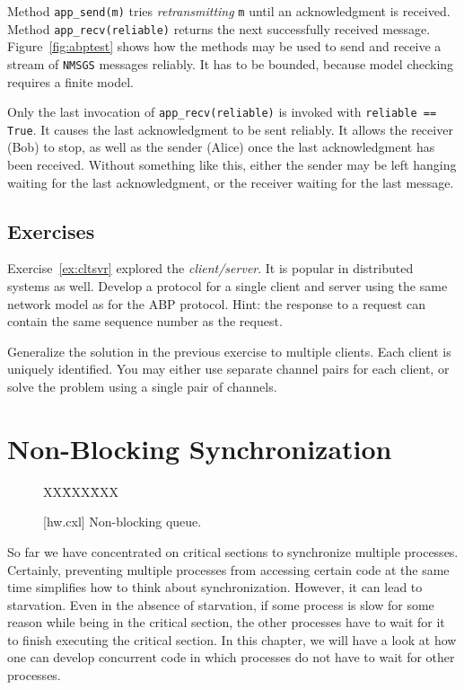 \documentclass{report}
\newcommand{\cxlsource}[1]{
\begin{tabbing}
XX\=XXX\=XXX\kill
    
\end{tabbing}
}
\newenvironment{code}{
\tcolorbox
}{
\endtcolorbox
}
\begin{document}
Method \texttt{app\_send(m)} tries \emph{retransmitting} \texttt{m} until
an acknowledgment is received.
Method \texttt{app\_recv(reliable)} returns the next successfully received
message.
Figure~\ref{fig:abptest} shows how the methods may be used to send and receive
a stream of \texttt{NMSGS} messages reliably.
It has to be bounded, because model checking requires a finite model.

Only the last invocation of \texttt{app\_recv(reliable)} is invoked with
\texttt{reliable == True}.  It causes the last acknowledgment to be sent
reliably.  It allows the receiver (Bob) to stop, as well as the sender (Alice)
once the last acknowledgment has been received.
Without something like this, either the sender may be left hanging waiting
for the last acknowledgment, or the receiver waiting for the last message.

\section*{Exercises}
\begin{problems}
\item Exercise~\ref{ex:cltsvr} explored the \emph{client/server}.  It is popular
in distributed systems as well.
Develop a protocol for a single client and server using the same network
model as for the ABP protocol.
Hint: the response to a request can contain the same sequence number as the
request.
\item Generalize the solution in the previous exercise to multiple clients.
Each client is uniquely identified.  You may either use separate channel pairs
for each client, or solve the problem using a single pair of channels.
\end{problems}

\chapter{Non-Blocking Synchronization}
\label{ch:nonblocking}


\begin{figure}
\begin{code}
\cxlsource{hw}
\end{code}
\caption{[hw.cxl] Non-blocking queue.}
\label{fig:hw}
\end{figure}

So far we have concentrated on critical sections to synchronize multiple
processes.  Certainly, preventing multiple processes from accessing
certain code at the same time simplifies how to think about synchronization.
However, it can lead to starvation.  Even in the absence of starvation,
if some process is slow for some reason while being in the critical section,
the other processes have to wait for it to finish executing the critical section.
In this chapter, we will have a look at how one can develop concurrent
code in which processes do not have to wait for other processes.
\end{document}
